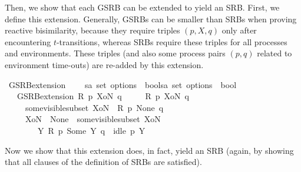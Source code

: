 \begin{isabellebody}
%
\endisatagproof
{\isafoldproof}%
%
\isadelimproof
%
\endisadelimproof
%
\begin{isamarkuptext}%
Then, we show that each GSRB can be extended to yield an SRB. First, we define this extension. Generally, GSRBs can be smaller than SRBs when proving reactive bisimilarity, because they require triples $(p,X,q)$ only after encountering $t$-transitions, whereas SRBs require these triples for all processes and environments. These triples (and also some process pairs $(p,q)$ related to environment time-outs) are re-added by this extension.%
\end{isamarkuptext}\isamarkuptrue%
\isamarkupfalse%
\ GSRB{\isacharunderscore}{\kern0pt}extension\ \isanewline
\ \ {\isacharcolon}{\kern0pt}{\isacharcolon}{\kern0pt}\ {\isacartoucheopen}{\isacharparenleft}{\kern0pt}{\isacharprime}{\kern0pt}s{\isasymRightarrow}{\isacharprime}{\kern0pt}a\ set\ option{\isasymRightarrow}{\isacharprime}{\kern0pt}s\ {\isasymRightarrow}\ bool{\isacharparenright}{\kern0pt}{\isasymRightarrow}{\isacharparenleft}{\kern0pt}{\isacharprime}{\kern0pt}s{\isasymRightarrow}{\isacharprime}{\kern0pt}a\ set\ option{\isasymRightarrow}{\isacharprime}{\kern0pt}s\ {\isasymRightarrow}\ bool{\isacharparenright}{\kern0pt}{\isacartoucheclose}\isanewline
\ \ \ {\isacartoucheopen}{\isacharparenleft}{\kern0pt}GSRB{\isacharunderscore}{\kern0pt}extension\ R{\isacharparenright}{\kern0pt}\ p\ XoN\ q\ {\isasymequiv}\isanewline
\ \ \ \ {\isacharparenleft}{\kern0pt}R\ p\ XoN\ q{\isacharparenright}{\kern0pt}\isanewline
\ \ \ \ {\isasymor}\ {\isacharparenleft}{\kern0pt}some{\isacharunderscore}{\kern0pt}visible{\isacharunderscore}{\kern0pt}subset\ XoN\ {\isasymand}\ R\ p\ None\ q{\isacharparenright}{\kern0pt}\isanewline
\ \ \ \ {\isasymor}\ {\isacharparenleft}{\kern0pt}{\isacharparenleft}{\kern0pt}XoN\ {\isacharequal}{\kern0pt}\ None\ {\isasymor}\ some{\isacharunderscore}{\kern0pt}visible{\isacharunderscore}{\kern0pt}subset\ XoN{\isacharparenright}{\kern0pt}\ \isanewline
\ \ \ \ \ \ {\isasymand}\ {\isacharparenleft}{\kern0pt}{\isasymexists}\ Y{\isachardot}{\kern0pt}\ R\ p\ {\isacharparenleft}{\kern0pt}Some\ Y{\isacharparenright}{\kern0pt}\ q\ {\isasymand}\ idle\ p\ Y{\isacharparenright}{\kern0pt}{\isacharparenright}{\kern0pt}{\isacartoucheclose}%
\begin{isamarkuptext}%
Now we show that this extension does, in fact, yield an SRB (again, by showing that all clauses of the definition of SRBs are satisfied).%
\end{isamarkuptext}\isamarkuptrue%

\end{isabellebody}
